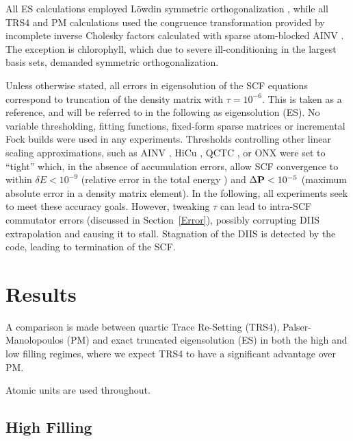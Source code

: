 \commentoutA{\documentclass[prl,aps,twocolumn,showpacs,twocolumngrid,superbib]{revtex4}}
\begin{document}
All ES calculations employed L{\"o}wdin symmetric orthogonalization \cite{PLowdin50,PLowdin56}, 
while all TRS4 and PM calculations used the congruence transformation provided by incomplete 
inverse Cholesky factors calculated with sparse atom-blocked AINV \cite{MChallacombe99,MBenzi01,MChallacombe03B}.
The exception is chlorophyll, which due to severe ill-conditioning in the largest basis sets, demanded symmetric 
orthogonalization.

Unless otherwise stated, all errors in eigensolution of the SCF equations correspond to 
truncation of the density matrix with $\tau=10^{-6}$.  This is taken as a reference, and will be
referred to in the following as eigensolution (ES).  No variable thresholding, fitting functions,
fixed-form sparse matrices or incremental Fock builds were used in any experiments.  Thresholds 
controlling other linear scaling approximations, such as 
AINV \cite{MChallacombe99,MBenzi01,MChallacombe03B}, 
HiCu \cite{MChallacombe00A,CGan03},  
QCTC \cite{MChallacombe96,MChallacombe96B,MChallacombe97,MChallacombe03A}, or
ONX \cite{ESchwegler96,ESchwegler97,ESchwegler98A,ESchwegler98C,ESchwegler99,ESchwegler00}
were set to ``tight''  which, in the absence of accumulation errors, allow SCF convergence to within 
$\delta E < 10^{-9}$ (relative error in the total energy ) and 
$\Delta{\bf P} < 10^{-5}$ (maximum absolute error in a density matrix element). In the following, all 
experiments seek to meet these accuracy goals.  However, tweaking $\tau$  can lead to intra-SCF commutator 
errors (discussed in Section~\ref{Error}), possibly corrupting DIIS extrapolation \cite{PPulay80,PPulay82} and 
causing it to stall.  Stagnation of the DIIS is detected by the code, leading to termination of the SCF.

\section{Results}\label{results}

A comparison is made between quartic Trace Re-Setting (TRS4), Palser-Manolopoulos \cite{APalser99}  
(PM) and exact truncated eigensolution (ES) in both the high and low filling regimes, where we expect 
TRS4 to have a significant advantage over PM.

\smallskip
Atomic units are used throughout. 

\subsection{High Filling}
\end{document}
